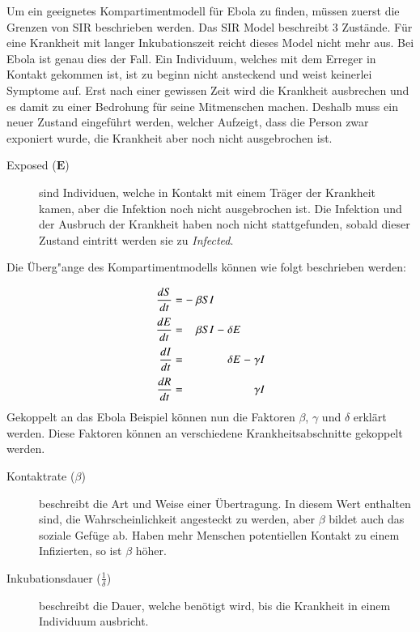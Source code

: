 \begin{refsection}
Um ein geeignetes Kompartimentmodell für Ebola zu finden, müssen zuerst die Grenzen von SIR beschrieben werden. 
Das SIR Model beschreibt 3 Zustände. 
Für eine Krankheit mit langer Inkubationszeit reicht dieses Model nicht mehr aus. 
Bei Ebola ist genau dies der Fall. Ein Individuum, welches mit dem Erreger in Kontakt gekommen ist, ist zu beginn nicht ansteckend und weist keinerlei Symptome auf. 
Erst nach einer gewissen Zeit wird die Krankheit ausbrechen und es damit zu einer Bedrohung für seine Mitmenschen machen. 
Deshalb muss ein neuer Zustand eingeführt werden, welcher Aufzeigt, dass die Person zwar exponiert wurde, die Krankheit aber noch nicht ausgebrochen ist.
\begin{figure}[ht]
  \centering
  
\end{figure}
\begin{description}
  \item [Exposed ($\mathbf{E}$)] sind Individuen, welche in Kontakt mit einem Träger der Krankheit kamen, aber die Infektion noch nicht ausgebrochen ist. Die Infektion und der Ausbruch der Krankheit haben noch nicht stattgefunden, sobald dieser Zustand eintritt werden sie zu \emph{Infected}.
\end{description}
Die Überg"ange des Kompartimentmodells können wie folgt beschrieben werden:
\[
\arraycolsep=1.4pt\def\arraystretch{2.2}
  \begin{array}{rccrcrcr}
   \displaystyle\frac{dS}{dt} & = &-&\beta S I& &        & &        \\
   \displaystyle\frac{dE}{dt} & = & &\beta S I&-&\delta E& &        \\
   \displaystyle\frac{dI}{dt} & = & &         & &\delta E&-&\gamma I\\
   \displaystyle\frac{dR}{dt} & = & &         & &        & &\gamma I
 \end{array}
\]
Gekoppelt an das Ebola Beispiel können nun die Faktoren $\beta$, $\gamma$ und $\delta$ erklärt werden. Diese Faktoren können an verschiedene Krankheitsabschnitte gekoppelt werden.
\begin{description}
  \item [Kontaktrate ($\beta$)] beschreibt die Art und Weise einer Übertragung. In diesem Wert enthalten sind, die Wahrscheinlichkeit angesteckt zu werden, aber $\beta$ bildet auch das soziale Gefüge ab. Haben mehr Menschen potentiellen Kontakt zu einem Infizierten, so ist $\beta$ höher.
  \item [Inkubationsdauer ($\frac{1}{\delta}$)] beschreibt die Dauer, welche benötigt wird, bis die Krankheit in einem Individuum ausbricht.

\end{description}
\end{refsection}
